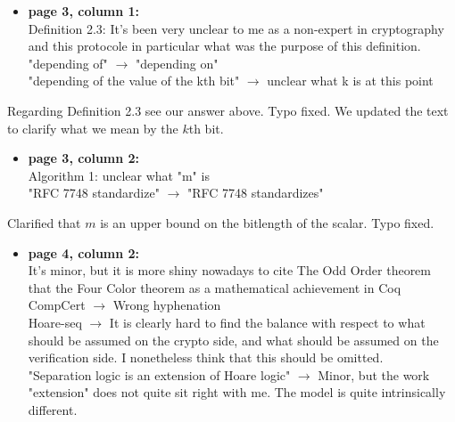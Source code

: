 \begin{itemize}

  \item \textbf{page 3, column 1:}\\
    Definition 2.3: It's been very unclear to me as a non-expert in cryptography and this protocole in particular what was the purpose of this definition.\\
    {\color{gray}"depending of" $\rightarrow$ "depending on"}\\
    "depending of the value of the kth bit" $\rightarrow$ unclear what k is at this point
\end{itemize}
\begin{answer}
  Regarding Definition 2.3 see our answer above. Typo fixed. 
  We updated the text to clarify what we mean by the $k$th bit.
\end{answer}

\begin{itemize}
  \item \textbf{page 3, column 2:}\\
    Algorithm 1: unclear what "m" is\\
    "RFC 7748 standardize" $\rightarrow$   "RFC 7748 standardizes"
\end{itemize}
\begin{answer}
  Clarified that $m$ is an upper bound on the bitlength of the scalar. Typo fixed.
\end{answer}

\begin{itemize}
  \item \textbf{page 4, column 2:}\\
    It's minor, but it is more shiny nowadays to cite The Odd Order theorem that the Four Color theorem as a mathematical achievement in Coq\\
    CompCert $\rightarrow$ Wrong hyphenation\\
    Hoare-seq $\rightarrow$ It is clearly hard to find the balance with respect to what should be assumed on the crypto side, and what should be assumed on the verification side. I nonetheless think that this should be omitted.\\
    "Separation logic is an extension of Hoare logic" $\rightarrow$ Minor, but the work "extension" does not quite sit right with me. The model is quite intrinsically different.
\end{itemize}
\begin{answer}
\end{answer}

